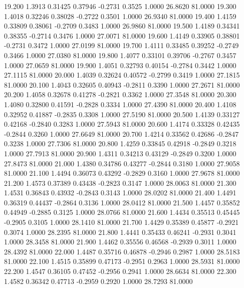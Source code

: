   19.200   1.3913   0.31425   0.37946  -0.2731   0.3525   1.0000  26.8620  81.0000
  19.300   1.4018   0.32246   0.38028  -0.2722   0.3501   1.0000  26.9340  81.0000
  19.400   1.4159   0.33809   0.38061  -0.2709   0.3483   1.0000  26.9860  81.0000
  19.500   1.4189   0.34341   0.38355  -0.2714   0.3476   1.0000  27.0071  81.0000
  19.600   1.4149   0.33905   0.38801  -0.2731   0.3472   1.0000  27.0199  81.0000
  19.700   1.4111   0.33485   0.39252  -0.2749   0.3466   1.0000  27.0380  81.0000
  19.800   1.4077   0.33101   0.39706  -0.2767   0.3457   1.0000  27.0659  81.0000
  19.900   1.4051   0.32793   0.40154  -0.2784   0.3442   1.0000  27.1115  81.0000
  20.000   1.4039   0.32624   0.40572  -0.2799   0.3419   1.0000  27.1815  81.0000
  20.100   1.4043   0.32605   0.40943  -0.2811   0.3390   1.0000  27.2671  81.0000
  20.200   1.4058   0.32678   0.41278  -0.2821   0.3362   1.0000  27.3548  81.0000
  20.300   1.4080   0.32800   0.41591  -0.2828   0.3334   1.0000  27.4390  81.0000
  20.400   1.4108   0.32952   0.41887  -0.2835   0.3308   1.0000  27.5190  81.0000
  20.500   1.4139   0.33127   0.42168  -0.2840   0.3283   1.0000  27.5943  81.0000
  20.600   1.4174   0.33328   0.42435  -0.2844   0.3260   1.0000  27.6649  81.0000
  20.700   1.4214   0.33562   0.42686  -0.2847   0.3238   1.0000  27.7306  81.0000
  20.800   1.4259   0.33845   0.42918  -0.2849   0.3218   1.0000  27.7913  81.0000
  20.900   1.4311   0.34213   0.43129  -0.2849   0.3200   1.0000  27.8473  81.0000
  21.000   1.4380   0.34786   0.43277  -0.2844   0.3180   1.0000  27.9058  81.0000
  21.100   1.4494   0.36073   0.43292  -0.2829   0.3160   1.0000  27.9678  81.0000
  21.200   1.4573   0.37389   0.43438  -0.2823   0.3147   1.0000  28.0063  81.0000
  21.300   1.4531   0.36843   0.43932  -0.2843   0.3143   1.0000  28.0202  81.0000
  21.400   1.4491   0.36319   0.44437  -0.2864   0.3136   1.0000  28.0412  81.0000
  21.500   1.4457   0.35852   0.44949  -0.2885   0.3125   1.0000  28.0766  81.0000
  21.600   1.4434   0.35513   0.45445  -0.2905   0.3105   1.0000  28.1410  81.0000
  21.700   1.4429   0.35389   0.45877  -0.2921   0.3074   1.0000  28.2395  81.0000
  21.800   1.4441   0.35433   0.46241  -0.2931   0.3041   1.0000  28.3458  81.0000
  21.900   1.4462   0.35556   0.46568  -0.2939   0.3011   1.0000  28.4392  81.0000
  22.000   1.4487   0.35716   0.46878  -0.2946   0.2987   1.0000  28.5183  81.0000
  22.100   1.4515   0.35899   0.47173  -0.2951   0.2963   1.0000  28.5931  81.0000
  22.200   1.4547   0.36105   0.47452  -0.2956   0.2941   1.0000  28.6634  81.0000
  22.300   1.4582   0.36342   0.47713  -0.2959   0.2920   1.0000  28.7293  81.0000
